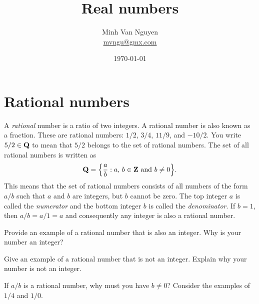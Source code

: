 \documentclass[a4paper,oneside,12pt]{article}
\begin{document}
\title{\Large\bf Real numbers}
\author{%
  Minh Van Nguyen \\
  \url{mvngu@gmx.com}
}
\date{\today}
\maketitle


\section{Rational numbers}

A \emph{rational} number is a ratio of two integers.  A
rational number is also known as a fraction.  These are rational
numbers: $1/2$, $3/4$, $11/9$, and $-10/2$.  You write $5/2 \in \mathbf{Q}$
to mean that $5/2$ belongs to the set of rational numbers.  The set of
all rational numbers is written as
\[
\QQ
=
\setdes{
  \frac{a}{b}
}{
  \pair{a}{b} \in \ZZ
  \text{ and }
  b \neq 0
}.
\]
This means that the set of rational numbers consists of all numbers of
the form $a/b$ such that $a$ and $b$ are integers, but $b$ cannot be
zero.  The top integer $a$ is called the \emph{numerator} and the
bottom integer $b$ is called the \emph{denominator}.  If $b = 1$, then
$a/b = a/1 = a$ and consequently any integer is also a rational
number.

\begin{exercise}
Provide an example of a rational number that is also an integer.  Why
is your number an integer?
\end{exercise}


\begin{exercise}
Give an example of a rational number that is not an integer.  Explain
why your number is not an integer.
\end{exercise}


\begin{exercise}
If $a/b$ is a rational number, why must you have $b \neq 0$?  Consider
the examples of $1/4$ and $1/0$.
\end{exercise}
\end{document}
